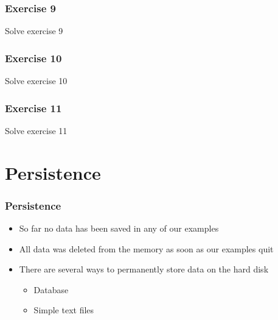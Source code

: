 \documentclass[10pt, a4paper]{beamer} %
\begin{document}
{
\bfseries
\begin{frame}[c]\frametitle{Exercise 9}
    Solve exercise 9
\end{frame}

\begin{frame}[c]\frametitle{Exercise 10}
Solve exercise 10
\end{frame}

\begin{frame}[c, fragile]\frametitle{Exercise 11}
Solve exercise 11
\end{frame}

}


\section{Persistence} %
\label{sec:persistence}

\begin{frame}[c, fragile]\frametitle{Persistence}
\begin{itemize}
    \item So far no data has been saved in any of our examples
    \item All data was deleted from the memory as soon as our examples quit
    \item There are several ways to permanently store data on the hard disk
    \begin{itemize}
        \item Database
        \item Simple text files
    \end{itemize}
\end{itemize}
\end{frame}
\end{document}
